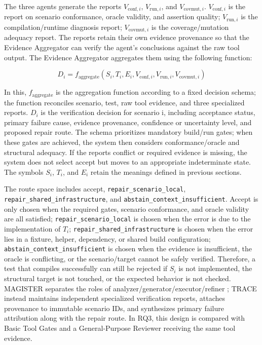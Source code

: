 \documentclass[pdflatex,sn-basic,Numbered,iicol]{sn-jnl}
\begin{document}
The three agents generate the reports $V_{\mathrm{conf},i}$, $V_{\mathrm{run},i}$, and $V_{\mathrm{covmut},i}$. $V_{\mathrm{conf},i}$ is the report on scenario conformance, oracle validity, and assertion quality; $V_{\mathrm{run},i}$ is the compilation/runtime diagnosis report; $V_{\mathrm{covmut},i}$ is the coverage/mutation adequacy report. The reports retain their own evidence provenance so that the Evidence Aggregator can verify the agent's conclusions against the raw tool output. The Evidence Aggregator aggregates them using the following function:

\begin{equation}
D_i = f_{\mathrm{aggregate}}(S_i,T_i,E_i,V_{\mathrm{conf},i},V_{\mathrm{run},i},V_{\mathrm{covmut},i})
\label{eq:evidence-aggregation}
\end{equation}

In this, $f_{\mathrm{aggregate}}$ is the aggregation function according to a fixed decision schema; the function reconciles scenario, test, raw tool evidence, and three specialized reports. $D_i$ is the verification decision for scenario i, including acceptance status, primary failure cause, evidence provenance, confidence or uncertainty level, and proposed repair route. The schema prioritizes mandatory build/run gates; when these gates are achieved, the system then considers conformance/oracle and structural adequacy. If the reports conflict or required evidence is missing, the system does not select accept but moves to an appropriate indeterminate state. The symbols $S_i$, $T_i$, and $E_i$ retain the meanings defined in previous sections.

The route space includes accept, \texttt{repair\_scenario\_local}, \texttt{repair\_shared\_infrastructure}, and \texttt{abstain\_context\_insufficient}. Accept is only chosen when the required gates, scenario conformance, and oracle validity are all satisfied; \texttt{repair\_scenario\_local} is chosen when the error is due to the implementation of $T_i$; \texttt{repair\_shared\_infrastructure} is chosen when the error lies in a fixture, helper, dependency, or shared build configuration; \texttt{abstain\_context\_insufficient} is chosen when the evidence is insufficient, the oracle is conflicting, or the scenario/target cannot be safely verified. Therefore, a test that compiles successfully can still be rejected if $S_i$ is not implemented, the structural target is not touched, or the expected behavior is not checked. MAGISTER separates the roles of analyzer/generator/executor/refiner \cite{bib31}; TRACE instead maintains independent specialized verification reports, attaches provenance to immutable scenario IDs, and synthesizes primary failure attribution along with the repair route. In RQ3, this design is compared with Basic Tool Gates and a General-Purpose Reviewer receiving the same tool evidence.
\end{document}
